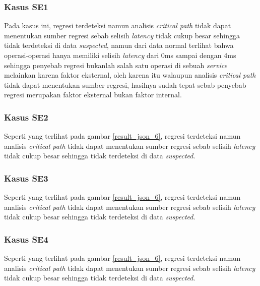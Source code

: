 \subsubsection{Kasus SE1}
Pada kasus ini, regresi terdeteksi namun analisis \textit{critical path} tidak dapat menentukan sumber regresi sebab selisih \textit{latency} tidak cukup besar sehingga tidak terdeteksi di data \textit{suspected}, namun dari data normal terlihat bahwa operasi-operasi hanya memiliki selisih \textit{latency} dari 0ms sampai dengan 4ms sehingga penyebab regresi bukanlah salah satu operasi di sebuah \textit{service} melainkan karena faktor eksternal, oleh karena itu walaupun analisis \textit{critical path} tidak dapat menentukan sumber regresi, hasilnya sudah tepat sebab penyebab regresi merupakan faktor eksternal bukan faktor internal.

\subsubsection{Kasus SE2}
Seperti yang terlihat pada gambar \ref{result_json_6}, regresi terdeteksi namun analisis \textit{critical path} tidak dapat menentukan sumber regresi sebab selisih \textit{latency} tidak cukup besar sehingga tidak terdeteksi di data \textit{suspected}.

\subsubsection{Kasus SE3}
Seperti yang terlihat pada gambar \ref{result_json_6}, regresi terdeteksi namun analisis \textit{critical path} tidak dapat menentukan sumber regresi sebab selisih \textit{latency} tidak cukup besar sehingga tidak terdeteksi di data \textit{suspected}.



\subsubsection{Kasus SE4}
Seperti yang terlihat pada gambar \ref{result_json_6}, regresi terdeteksi namun analisis \textit{critical path} tidak dapat menentukan sumber regresi sebab selisih \textit{latency} tidak cukup besar sehingga tidak terdeteksi di data \textit{suspected}.

